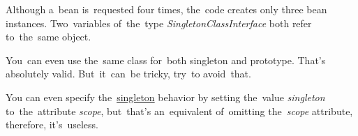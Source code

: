 \noindent Although a~bean is~requested four times, the~code creates only three bean instances. Two~variables of~the~type \textit{SingletonClassInterface} both refer to~the~same object.
\newpage

\newline\note You~can even use the~same class for~both singleton and prototype. That's absolutely valid. But~it~can~be tricky, try~to avoid~that.

\newline\note You can even specify the~\hyperref[singletondp]{singleton} behavior by setting the~value \textit{singleton} to~the~attribute \textit{scope}, but~that's an~equivalent of~omitting the~\textit{scope} attribute, therefore, it's~useless.